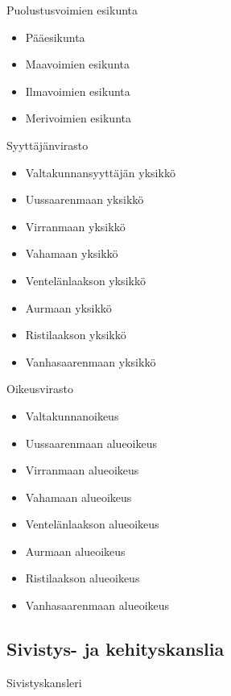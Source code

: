 \documentclass{article}
\begin{document}
	\vspace{12pt}
	
	Puolustusvoimien esikunta
	\begin{itemize}
		\item Pääesikunta
		\item Maavoimien esikunta
		\item Ilmavoimien esikunta
		\item Merivoimien esikunta
	\end{itemize}

	\vspace{12pt}
	
	Syyttäjänvirasto
	\begin{itemize}
		\item Valtakunnansyyttäjän yksikkö
		\item Uussaarenmaan yksikkö
		\item Virranmaan yksikkö
		\item Vahamaan yksikkö
		\item Ventelänlaakson yksikkö
		\item Aurmaan yksikkö
		\item Ristilaakson yksikkö
		\item Vanhasaarenmaan yksikkö
	\end{itemize}

	\vspace{12pt}
	
	Oikeusvirasto
	\begin{itemize}
		\item Valtakunnanoikeus
		\item Uussaarenmaan alueoikeus
		\item Virranmaan alueoikeus
		\item Vahamaan alueoikeus
		\item Ventelänlaakson alueoikeus
		\item Aurmaan alueoikeus
		\item Ristilaakson alueoikeus
		\item Vanhasaarenmaan alueoikeus
	\end{itemize}

	\subsection{Sivistys- ja kehityskanslia}
	Sivistyskansleri
	
	\vspace{12pt}
	
\end{document}
